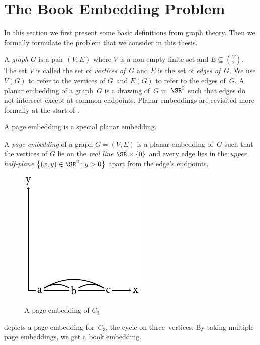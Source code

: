 \section{The Book Embedding Problem}\label{section:book-problem}

In this section we first present some basic definitions from graph theory. Then we formally formulate the problem \probBook that we consider in this thesis.

A \emph{graph} $G$ is a pair $(V, E)$ where $V$ is a non-empty finite set and
$E \subseteq \binom{V}{2}$. The set $V$ is called the set of \emph{vertices of~$G$}
and $E$ is the set of \emph{edges of~$G$}. We use $V(G)$ to refer to the vertices
of $G$~and $E(G)$ to refer to the edges of~$G$. A planar embedding of a graph~$G$ is a drawing of~$G$ in~$\SR^2$
such that edges do not intersect except at common endpoints. Planar embeddings are revisited more formally at the start of .

A page embedding is a special planar embedding.

\begin{definition}
\label{def:page-embed}
A \emph{page embedding} of a graph $G = (V, E)$ is a planar embedding of~$G$ such that
the vertices of $G$ lie on the \emph{real line} $\SR \times \{0\}$ and every edge lies in the \emph{upper half-plane} $\bigl\{(x, y) \in \SR^2\colon y > 0\bigr\}$ apart from the edge's endpoints.
\end{definition}

\begin{figure}[\placement]
	\centering
	\includegraphics{figures/t_page_c3}
	\label{figure:page-c3}
	\caption[Page embedding of $C_3$]{A page embedding of $C_3$}
\end{figure}

 depicts a page embedding for~$C_3$, the cycle on three~vertices.
By taking multiple page embeddings, we get a book embedding. 

